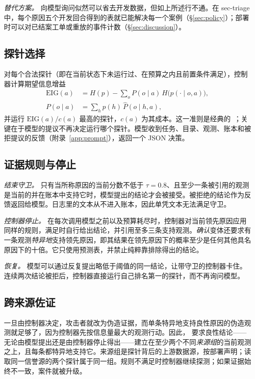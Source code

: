 \emph{替代方案。} 向模型询问似然可以省去开发数据，但如上所述行不通。在 sec-triage 中，每个原因五个开发回合得到的表就已能解决每一个案例（\S\ref{sec:policy}）；部署时可以对已结案工单或重放的事件计数（\S\ref{sec:discussion}）。

\subsection{探针选择}
\label{sec:selection}
对每个合法探针（即在当前状态下未运行过、在预算之内且前置条件满足），控制器计算期望信息增益
\begin{align*}
\mathrm{EIG}(a) &= H(p) - \textstyle\sum_{o} P(o \mid a)\, H\big(p(\cdot \mid o, a)\big),\\
P(o \mid a) &= \textstyle\sum_h p(h)\, \widehat P(o \mid h, a),
\end{align*}
并运行 $\mathrm{EIG}(a)/c(a)$ 最高的探针，$c(a)$ 为其成本。这一准则是经典的~\citep{dekleer1987,golovin2010}；关键在于模型的提议不再决定运行哪个探针。模型收到任务、目录、观测、账本和被拒提议的反馈（附录~\ref{app:prompt}），返回一个 JSON 决策。

\subsection{证据规则与停止}
\label{sec:finish}
\emph{结束守卫。} 只有当所称原因的当前分数不低于 $\tau = 0.8$、且至少一条被引用的观测是当前的并在账本中支持它时，模型提出的结论才会被接受。被拒绝的结论作为反馈返回给模型。日志里的文本从不进入账本，因此单凭文本无法满足守卫。

\emph{控制器停止。} 在每次调用模型之前以及预算耗尽时，控制器对当前领先原因应用同样的规则，满足时自行给出结论，并引用至多三条支持观测。\emph{确认}变体还要求有一条观测\emph{特异地}支持领先原因，即其结果在领先原因下的概率至少是任何其他具名原因下的十倍。它只使用预测表，并禁止纯粹靠排除得出的结论。

\emph{恢复。} 模型可以通过反复提出略低于阈值的同一结论，让带守卫的控制器卡住。连续两次结论被拒后，控制器直接运行自己排名第一的探针，而不再询问模型。

\subsection{跨来源佐证}
\label{sec:corroboration}
一旦由控制器决定，攻击者就改为伪造证据，而单条特异地支持良性原因的伪造观测就足够了，因为控制器先按信息量最大的观测行动。因此，\hesp{} 要求良性结论——无论由模型提出还是由控制器停止得出——建立在至少两个不同\emph{来源组}的当前观测之上，且每条都特异地支持它。来源组是探针背后的上游数据源，按部署声明；读取同一信誉源的两个探针属于同一组。规则不满足时控制器继续探测；如果证据始终不一致，案件就被升级。

